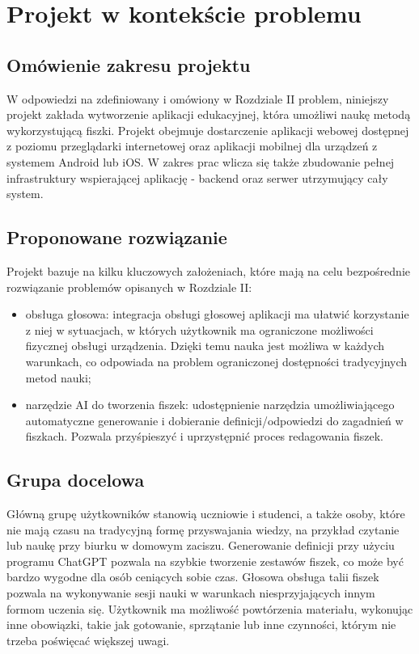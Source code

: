 \chapter{Projekt w kontekście problemu}

\section{Omówienie zakresu projektu}

W odpowiedzi na zdefiniowany i omówiony w Rozdziale II problem, niniejszy projekt zakłada wytworzenie aplikacji edukacyjnej, która umożliwi naukę metodą wykorzystującą fiszki. Projekt obejmuje dostarczenie aplikacji webowej dostępnej z poziomu przeglądarki internetowej oraz aplikacji mobilnej dla urządzeń z systemem Android lub iOS. W zakres prac wlicza się także zbudowanie pełnej infrastruktury wspierającej aplikację - backend oraz serwer utrzymujący cały system.

\section{Proponowane rozwiązanie}

Projekt bazuje na kilku kluczowych założeniach, które mają na celu bezpośrednie rozwiązanie problemów opisanych w Rozdziale II:

\begin{itemize}
    \item obsługa głosowa: integracja obsługi głosowej aplikacji ma ułatwić korzystanie z niej w sytuacjach, w których użytkownik ma ograniczone możliwości fizycznej obsługi urządzenia. Dzięki temu nauka jest możliwa w każdych warunkach, co odpowiada na problem ograniczonej dostępności tradycyjnych metod nauki;
    \item narzędzie AI do tworzenia fiszek: udostępnienie narzędzia umożliwiającego automatyczne generowanie i dobieranie definicji/odpowiedzi do zagadnień w fiszkach. Pozwala przyśpieszyć i uprzystępnić proces redagowania fiszek.
\end{itemize}

\section{Grupa docelowa}

Główną grupę użytkowników stanowią uczniowie i studenci, a także osoby, które nie mają czasu na tradycyjną formę przyswajania wiedzy, na przykład czytanie lub naukę przy biurku w domowym zaciszu. Generowanie definicji przy użyciu programu ChatGPT pozwala na szybkie tworzenie zestawów fiszek, co może być bardzo wygodne dla osób ceniących sobie czas. Głosowa obsługa talii fiszek pozwala na wykonywanie sesji nauki w warunkach niesprzyjających innym formom uczenia się. Użytkownik ma możliwość powtórzenia materiału, wykonując inne obowiązki, takie jak gotowanie, sprzątanie lub inne czynności, którym nie trzeba poświęcać większej uwagi.

